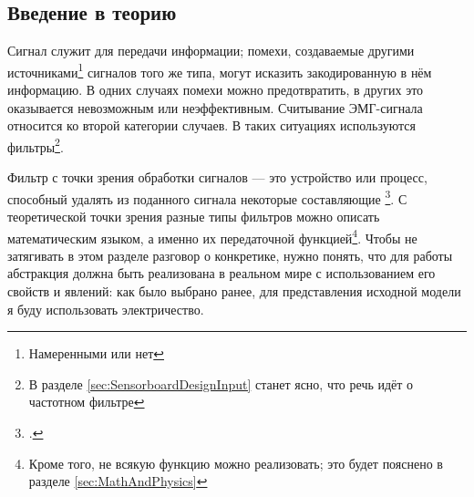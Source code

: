 \documentclass[a4paper, 10pt, final]{article} %
\begin{document}
    \subsection{Введение в теорию}\label{sec:IntroFiltersSignals}
    Сигнал служит для передачи информации; помехи, создаваемые другими источниками\footnote{Намеренными или нет} сигналов того же типа, могут исказить закодированную в нём информацию.
    В одних случаях помехи можно предотвратить, в других это оказывается невозможным или неэффективным.
    Считывание ЭМГ-сигнала относится ко второй категории случаев.
    В таких ситуациях используются фильтры\footnote{В разделе \ref{sec:SensorboardDesignInput} станет ясно, что речь идёт о частотном фильтре}.
    
    Фильтр с точки зрения обработки сигналов --- это устройство или процесс, способный удалять из поданного сигнала некоторые составляющие \footcite[]{Filter:Wiki}.
    С теоретической точки зрения разные типы фильтров можно описать математическим языком, а именно их передаточной функцией\footnote{Кроме того, не всякую функцию можно реализовать; это будет пояснено в разделе \ref{sec:MathAndPhysics}}.
    Чтобы не затягивать в этом разделе разговор о конкретике, нужно понять, что для работы абстракция должна быть реализована в реальном мире с использованием его свойств и явлений: как было выбрано ранее, для представления исходной модели я буду использовать электричество.
\end{document}
